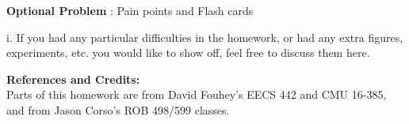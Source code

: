 \documentclass[onecolumn,10pt]{article}
\begin{document}
\addtocounter{problemnumber}{1}
\noindent\textbf{Optional Problem }: Pain points and Flash cards

i. If you had any particular difficulties in the homework, or had any extra figures, experiments, etc. you would like to show off, feel free to discuss them here.



\noindent\textbf{References and Credits:}\\
Parts of this homework are from David Fouhey's EECS 442 and CMU 16-385, and from Jason Corso's ROB 498/599 classes.
\end{document}
